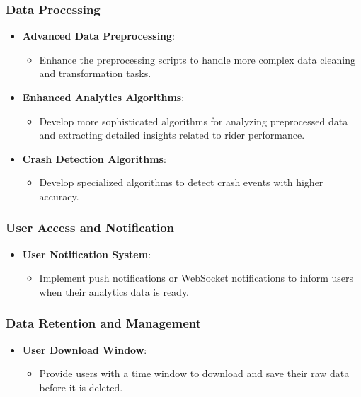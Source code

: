 \subsubsection{Data Processing}
\begin{itemize}
    \item \textbf{Advanced Data Preprocessing}:
        \begin{itemize}
            \item Enhance the preprocessing scripts to handle more complex data cleaning and transformation tasks.
        \end{itemize}
    \item \textbf{Enhanced Analytics Algorithms}:
        \begin{itemize}
            \item Develop more sophisticated algorithms for analyzing preprocessed data and extracting detailed insights related to rider performance.
        \end{itemize}
    \item \textbf{Crash Detection Algorithms}:
        \begin{itemize}
            \item Develop specialized algorithms to detect crash events with higher accuracy.
        \end{itemize}
\end{itemize}

\subsubsection{User Access and Notification}
\begin{itemize}
    \item \textbf{User Notification System}:
        \begin{itemize}
            \item Implement push notifications or WebSocket notifications to inform users when their analytics data is ready.
        \end{itemize}
\end{itemize}

\subsubsection{Data Retention and Management}
\begin{itemize}
    \item \textbf{User Download Window}:
        \begin{itemize}
            \item Provide users with a time window to download and save their raw data before it is deleted.
        \end{itemize}
\end{itemize}

